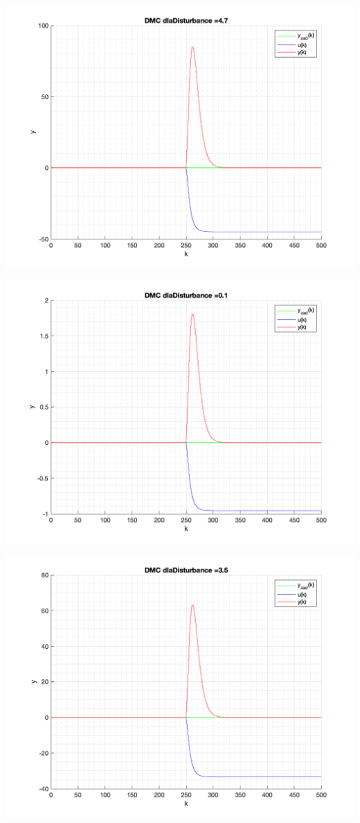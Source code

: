 \documentclass[a4paper, 11pt]{article}
\begin{document}
\begin{enumerate}
 \includegraphics[width=\linewidth]{./ModelsP4_Disturbance/P4_DMC_Disturbance_4_7_png.png} 
 
 \includegraphics[width=\linewidth]{./ModelsP4_Disturbance/P4_DMC_Disturbance_0_1_png.png} 
 
 \includegraphics[width=\linewidth]{./ModelsP4_Disturbance/P4_DMC_Disturbance_3_5_png.png} 
 

\end{enumerate}
\end{document}
